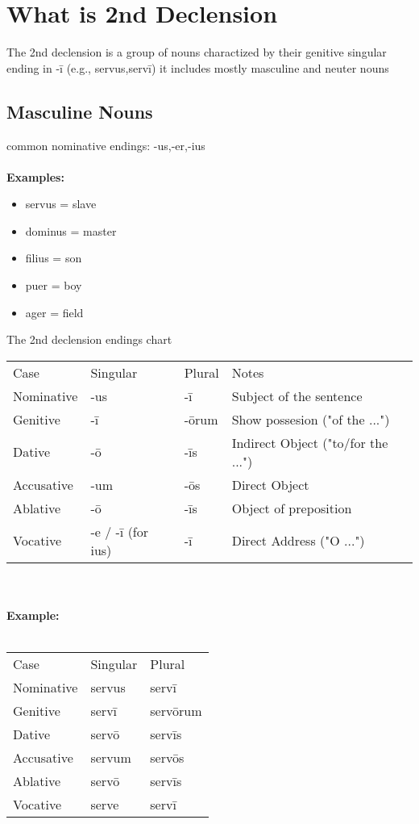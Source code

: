 \section*{What is 2nd Declension}
The 2nd declension is a group of nouns charactized by their 
genitive singular ending in -ī (e.g., servus,servī) it 
includes mostly masculine and neuter nouns
\subsection*{Masculine Nouns}
common nominative endings: -us,-er,-ius \\\\
\large{\textbf{Examples:}}
\begin{itemize}
  \item servus = slave
  \item dominus = master
  \item filius = son 
  \item puer = boy
  \item ager = field
\end{itemize}
The 2nd declension endings chart \\
\begin{tabular}{llll}
  Case & Singular & Plural & Notes \\ 
  Nominative & -us & -ī & Subject of the sentence \\
  Genitive & -ī & -ōrum & Show possesion ("of the ...") \\ 
  Dative & -ō & -īs & Indirect Object ("to/for the ...") \\ 
  Accusative & -um & -ōs & Direct Object \\ 
  Ablative & -ō & -īs & Object of preposition \\ 
  Vocative & -e / -ī (for ius) & -ī & Direct Address ("O ...") \\
\end{tabular}\\ \\
\large{\textbf{Example:}}\\ \\
\begin{tabular}{lll}
  Case & Singular & Plural \\ 
  Nominative & servus & servī \\ 
  Genitive & servī & servōrum \\ 
  Dative & servō & servīs \\ 
  Accusative & servum & servōs \\ 
  Ablative & servō & servīs \\ 
  Vocative & serve & servī \\
\end{tabular} \hspace{1cm}
